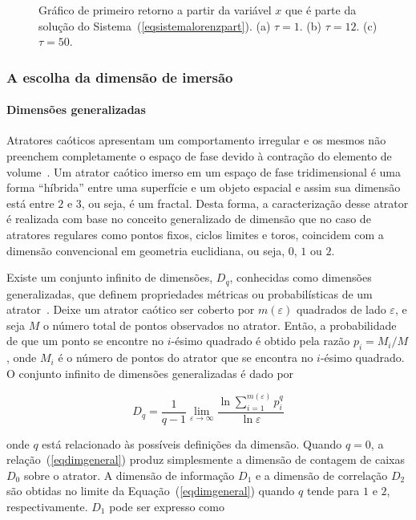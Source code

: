 \begin{figure}[ht]
\caption{Gráfico de primeiro retorno a partir da variável $x$ que é parte da solução do Sistema~(\ref{eqsistemalorenzpart}). (a) $\tau=1$. (b) $\tau=12$. (c) $\tau=50$.}
\label{figlorenzprimeiroret}
\end{figure}

\subsubsection{A escolha da dimensão de imersão}
\label{secdimimers}

\paragraph*{Dimensões generalizadas}
Atratores caóticos apresentam um comportamento irregular e os mesmos não preenchem completamente o espaço de fase devido à contração do elemento de volume~\cite{argyris/94}. Um atrator caótico imerso em um espaço de fase tridimensional é uma forma ``híbrida'' entre uma superfície e um objeto espacial e assim sua dimensão está entre $2$ e $3$, ou seja, é um fractal. Desta forma, a caracterização desse atrator é realizada com base no conceito generalizado de dimensão que no caso de atratores regulares como pontos fixos, ciclos limites e toros, coincidem com a dimensão convencional em geometria euclidiana, ou seja, $0$, $1$ ou $2$.

Existe um conjunto infinito de dimensões, $D_{q}$, conhecidas como dimensões generalizadas, que definem propriedades métricas ou probabilísticas de um atrator~\cite{hentschel/83}. Deixe um atrator caótico ser coberto por $m(\varepsilon)$ quadrados de lado $\varepsilon$, e seja $M$ o número total de pontos observados no atrator. Então, a probabilidade de que um ponto se encontre no $i$-ésimo quadrado é obtido pela razão $p_{i}=M_{i}/M$, onde $M_{i}$ é o número de pontos do atrator que se encontra no $i$-ésimo quadrado. O conjunto infinito de dimensões generalizadas é dado por

\begin{equation}
D_{q}=\dfrac{1}{q-1}\lim_{\varepsilon\rightarrow\infty}\dfrac{\ln \sum_{i=1}^{m(\varepsilon)}p_{i}^q}{\ln \varepsilon}
\label{eqdimgeneral}
\end{equation}

onde $q$ está relacionado às possíveis definições da dimensão. Quando $q=0$, a relação~(\ref{eqdimgeneral}) produz simplesmente a dimensão de contagem de caixas $D_{0}$ sobre o atrator. A dimensão de informação $D_{1}$ e a dimensão de correlação $D_{2}$ são obtidas no limite da Equação~(\ref{eqdimgeneral}) quando $q$ tende para $1$ e $2$, respectivamente. $D_{1}$ pode ser expresso como~\cite{farmer/83}

